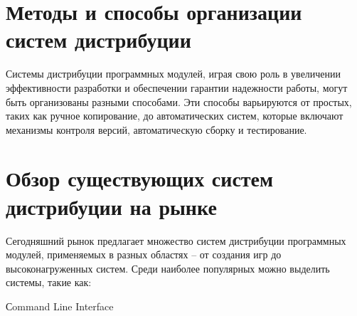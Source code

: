 \section{Методы и способы организации систем дистрибуции}

Системы дистрибуции программных модулей, играя свою роль в увеличении эффективности разработки и обеспечении гарантии надежности работы, могут быть организованы разными способами. Эти способы варьируются от простых, таких как ручное копирование, до автоматических систем, которые включают механизмы контроля версий, автоматическую сборку и тестирование.

\section{Обзор существующих систем дистрибуции на рынке}

Сегодняшний рынок предлагает множество систем дистрибуции программных модулей, применяемых в разных областях – от создания игр до высоконагруженных систем. Среди наиболее популярных можно выделить системы, такие как:



 {Сommand Line Interface}

